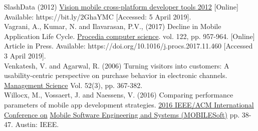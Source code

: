 \documentclass[version=last,fontsize=13pt]{scrartcl}
\begin{document}
SlashData (2012) \underline{Vision mobile cross-platform developer tools 2012}  [Online] Available: https://bit.ly/2GhaYMC [Accessed: 5 April 2019].\\

Vagrani, A., Kumar, N. and Ilavarasan, P.V., (2017) Decline in Mobile Application Life Cycle. \underline{Procedia computer science}. vol. 122, pp. 957-964. [Online] Article in Press. Available: https://doi.org/10.1016/j.procs.2017.11.460 [Accessed 3 April 2019].\\

Venkatesh, V. and Agarwal, R. (2006) Turning visitors into customers: A usability-centric perspective on purchase behavior in electronic channels. \underline{Management Science} Vol. 52(3),  pp. 367-382.\\

Willocx, M., Vossaert, J. and Naessens, V. (2016) Comparing performance parameters of mobile app development strategies.  \underline{2016 IEEE/ACM International Conference on} \underline{Mobile Software Engineering and Systems (MOBILESoft)} pp. 38-47.  Austin: IEEE.\\
\end{document}
